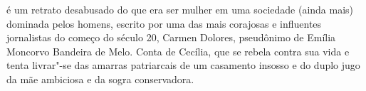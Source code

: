 \hspace*{-7cm}\hrulefill\hspace*{-7cm}

\medskip

 é um retrato desabusado do que era ser mulher em uma sociedade (ainda mais) dominada pelos homens, escrito por uma das mais corajosas e influentes jornalistas do começo do século 20, Carmen Dolores, pseudônimo de Emília Moncorvo Bandeira de Melo. Conta de Cecília, que se rebela contra sua vida e tenta livrar"-se das amarras patriarcais de um casamento insosso e do duplo jugo da mãe ambiciosa e da sogra conservadora.

\vfill

\hspace*{-.4cm}\begin{minipage}[c]{1\linewidth}
\small{
{}}
\end{minipage}

\pagebreak


